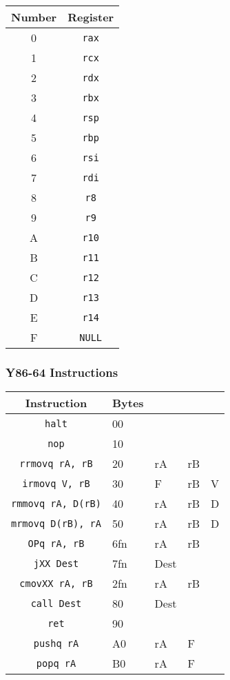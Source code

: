 \documentclass[10pt]{armath}
\newcommand{\s}[1]{\texttt{#1}}
\begin{document}
\begin{center}
  \begin{tabular}{c c}
    Number & Register\\
    \hline
    0 & \s{rax}\\
    1 & \s{rcx}\\
    2 & \s{rdx}\\
    3 & \s{rbx}\\
    4 & \s{rsp}\\
    5 & \s{rbp}\\
    6 & \s{rsi}\\
    7 & \s{rdi}\\
    8 & \s{r8}\\
    9 & \s{r9}\\
    A & \s{r10}\\
    B & \s{r11}\\
    C & \s{r12}\\
    D & \s{r13}\\
    E & \s{r14}\\
    F & \s{NULL}\\\hline
  \end{tabular}
\end{center}

\subsubsection{Y86-64 Instructions}%
\label{ssub:y86_64_instructions}

\begin{center}
  \begin{tabular}{c l l l l}
    Instruction & Bytes & & &\\\hline
    \s{halt} & 00 & & &\\
    \s{nop} & 10 & & &\\
    \s{rrmovq rA, rB} & 20 & rA & rB &\\
    \s{irmovq V, rB} & 30 & F & rB & V\\
    \s{rmmovq rA, D(rB)} & 40 & rA & rB & D\\
    \s{mrmovq D(rB), rA} & 50 & rA & rB & D\\
    \s{OPq rA, rB} & 6fn & rA & rB &\\
    \s{jXX Dest} & 7fn & Dest\\
    \s{cmovXX rA, rB} & 2fn & rA & rB\\
    \s{call Dest} & 80 & Dest\\
    \s{ret} & 90 & & &\\
    \s{pushq rA} & A0 & rA & F\\
    \s{popq rA} & B0 & rA & F\\\hline
  \end{tabular}
\end{center}
\end{document}
